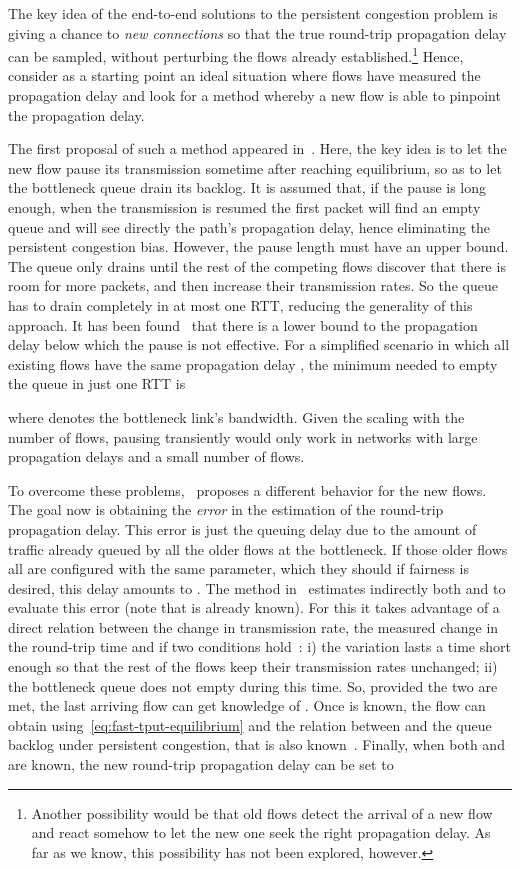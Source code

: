 \documentclass[english,times]{ettauth}
\begin{document}
The key idea of the end-to-end solutions to the persistent congestion problem
is giving a chance to \emph{new connections} so that the true round-trip
propagation delay can be sampled, without perturbing the flows already
established.\footnote{Another possibility would be that old flows detect the
  arrival of a new flow and react somehow to let the new one seek the right
  propagation delay. As far as we know, this possibility has not been
  explored, however.} Hence, consider as a starting point an ideal situation
where  flows have measured the propagation delay and look for a method
whereby a new flow is able to pinpoint the propagation delay.

The first proposal of such a method appeared in~\cite{Cui06}. Here, the key
idea is to let the new flow pause its transmission sometime after reaching
equilibrium, so as to let the bottleneck queue drain its backlog. It is
assumed that, if the pause is long enough, when the transmission is resumed
the first packet will find an empty queue and will see directly the path's
propagation delay, hence eliminating the persistent congestion bias. However,
the pause length must have an upper bound. The queue only drains until the
rest of the competing flows discover that there is room for more packets, and
then increase their transmission rates. So the queue has to drain completely
in at most one RTT, reducing the generality of this approach. It has been
found~\cite{Rperez08b} that there is a lower bound to the propagation delay
below which the pause is not effective. For a simplified scenario in which all
existing flows have the same propagation delay , the minimum  needed to
empty the queue in just one RTT is

where  denotes the bottleneck link's bandwidth. Given the scaling with the
number of flows, pausing transiently would only work in networks with large
propagation delays and a small number of flows.

To overcome these problems,~\cite{Rperez08b} proposes a different behavior for
the new flows. The goal now is obtaining the \emph{error} in the estimation of
the round-trip propagation delay. This error is just the queuing delay due to
the amount of traffic already queued by all the older flows at the bottleneck.
If those older flows all are configured with the same  parameter,
which they should if fairness is desired, this delay amounts to . The method in~\cite{Rperez08b} estimates indirectly both
 and  to evaluate this error (note that  is already
known). For this it takes advantage of a direct relation between the change in
transmission rate, the measured change in the round-trip time and  if two
conditions hold~\cite{Rperez10}: i) the variation lasts a time short enough so
that the rest of the flows keep their transmission rates unchanged; ii) the
bottleneck queue does not empty during this time. So, provided the two are
met, the last arriving flow can get knowledge of . Once  is
known, the flow can obtain  using~\eqref{eq:fast-tput-equilibrium} and
the relation between  and the queue backlog under persistent congestion,
that is also known~\cite{Rperez10}. Finally, when both  and 
are known, the new round-trip propagation delay  can be set to
\end{document}

